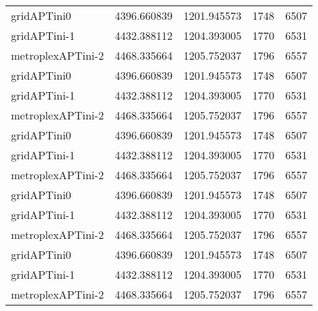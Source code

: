 \begin{table}[h]
\begin{longtable}{lrrrr}
gridAPTini0 & 4396.660839 & 1201.945573 & 1748 & 6507 \\
gridAPTini-1 & 4432.388112 & 1204.393005 & 1770 & 6531 \\
metroplexAPTini-2 & 4468.335664 & 1205.752037 & 1796 & 6557 \\
gridAPTini0 & 4396.660839 & 1201.945573 & 1748 & 6507 \\
gridAPTini-1 & 4432.388112 & 1204.393005 & 1770 & 6531 \\
metroplexAPTini-2 & 4468.335664 & 1205.752037 & 1796 & 6557 \\
gridAPTini0 & 4396.660839 & 1201.945573 & 1748 & 6507 \\
gridAPTini-1 & 4432.388112 & 1204.393005 & 1770 & 6531 \\
metroplexAPTini-2 & 4468.335664 & 1205.752037 & 1796 & 6557 \\
gridAPTini0 & 4396.660839 & 1201.945573 & 1748 & 6507 \\
gridAPTini-1 & 4432.388112 & 1204.393005 & 1770 & 6531 \\
metroplexAPTini-2 & 4468.335664 & 1205.752037 & 1796 & 6557 \\
gridAPTini0 & 4396.660839 & 1201.945573 & 1748 & 6507 \\
gridAPTini-1 & 4432.388112 & 1204.393005 & 1770 & 6531 \\
metroplexAPTini-2 & 4468.335664 & 1205.752037 & 1796 & 6557 \\
\end{longtable}
\end{table}

